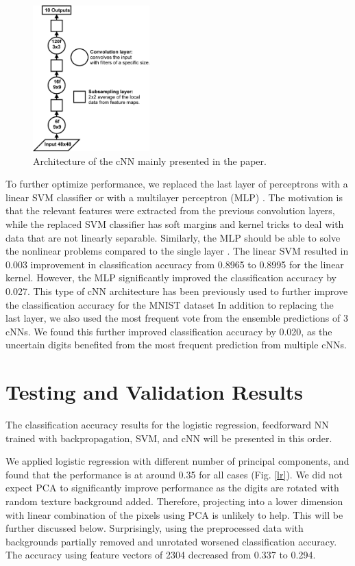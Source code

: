 \documentclass[conference]{IEEEtran}
\begin{document}
\begin{figure}[H]
\centering
\includegraphics[width=0.4\textwidth]{cNN.PNG}
\caption{\scriptsize Architecture of the cNN mainly presented in the paper.}
\label{cNN}
\end{figure}

To further optimize performance, we replaced the last layer of perceptrons with a linear SVM classifier or with a multilayer perceptron (MLP) \cite{DBLP:journals/corr/Tang13}. The motivation is that the relevant features were extracted from the previous convolution layers, while the replaced SVM classifier has soft margins and kernel tricks to deal with data that are not linearly separable. Similarly, the MLP should be able to solve the nonlinear problems compared to the single layer \cite{Min69, grossberg1973ces}. The linear SVM resulted in 0.003 improvement in classification accuracy from 0.8965 to 0.8995 for the linear kernel. However, the MLP significantly improved the classification accuracy by 0.027. This type of cNN architecture has been previously used to further improve the classification accuracy for the MNIST dataset \cite{lecun-98}
In addition to replacing the last layer, we also used the most frequent vote from the ensemble predictions of 3 cNNs. We found this further improved classification accuracy by 0.020, as the uncertain digits benefited from the most frequent prediction from multiple cNNs.

\section{Testing and Validation Results}

The classification accuracy results for the logistic regression, feedforward NN trained with backpropagation, SVM, and cNN will be presented in this order.

We applied logistic regression with different number of principal components, and found that the performance is at around 0.35 for all cases (Fig. \ref{lr}). We did not expect PCA to significantly improve performance as the digits are rotated with random texture background added. Therefore, projecting into a lower dimension with linear combination of the pixels using PCA is unlikely to help. This will be further discussed below. Surprisingly, using the preprocessed data with backgrounds partially removed and unrotated worsened classification accuracy. The accuracy using feature vectors of 2304 decreased from 0.337 to 0.294.
\end{document}
